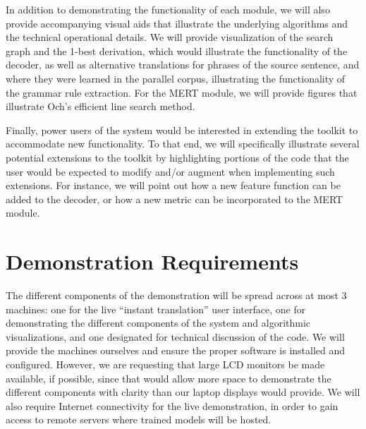 \documentclass[11pt]{article}
\begin{document}
In addition to demonstrating the functionality of each module, we will also
provide accompanying visual aids that illustrate the underlying algorithms and
the technical operational details.  We will provide visualization of the search
graph and the 1-best derivation, which would illustrate the functionality of
the decoder, as well as alternative translations for phrases of the source
sentence, and where they were learned in the parallel corpus, illustrating the
functionality of the grammar rule extraction.  For the MERT module, we will
provide figures that illustrate Och's efficient line search method.

Finally, power users of the system would be interested in extending the toolkit
to accommodate new functionality.  To that end, we will specifically illustrate
several potential extensions to the toolkit by highlighting portions of the
code that the user would be expected to modify and/or augment when implementing
such extensions.  For instance, we will point out how a new feature function
can be added to the decoder, or how a new metric can be incorporated to the
MERT module.

\section{Demonstration Requirements}

The different components of the demonstration will be spread across at most 3
machines: one for the live ``instant translation'' user interface, one for
demonstrating the different components of the system and algorithmic
visualizations, and one designated for technical discussion of the code.  We
will provide the machines ourselves and ensure the proper software is installed
and configured.  However, we are requesting that large LCD monitors be made
available, if possible, since that would allow more space to demonstrate the
different components with clarity than our laptop displays would provide.  We
will also require Internet connectivity for the live demonstration, in order to
gain access to remote servers where trained models will be hosted.







\end{document}
